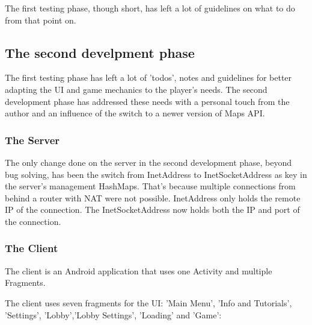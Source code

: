 The first testing phase, though short, has left a lot of guidelines on what to
do from that point on.\newline

\subsection{The second develpment phase}

The first testing phase has left a lot of 'todos', notes and guidelines for
better adapting the UI and game mechanics to the player's needs. The second
development phase has addressed these needs with a personal touch from the
author and an influence of the switch to a newer version of Maps API.

\subsubsection{The Server}

The only change done on the server in the second development phase, beyond bug
solving, has been the switch from InetAddress to InetSocketAddress as key in the
server's management HashMaps. That's because multiple connections from behind a
router with NAT were not possible. InetAddress only holds the remote IP of the
connection. The InetSocketAddress now holds both the IP and port of the
connection.

\subsubsection{The Client}

The client is an Android application that uses one Activity and multiple
Fragments. 

The client uses seven fragments for the UI: 'Main Menu', 'Info and
Tutorials', 'Settings', 'Lobby','Lobby Settings', 'Loading' and 'Game':


